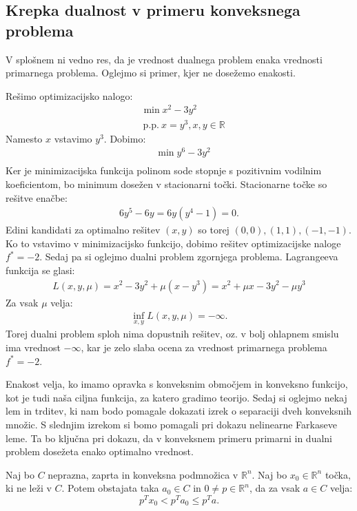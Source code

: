 \documentclass[mat1]{fmfdelo}
\newcommand{\R}{\mathbb R}
\begin{document}
\subsection{Krepka dualnost v primeru konveksnega problema}
V splošnem ni vedno res, da je vrednost dualnega problem enaka vrednosti primarnega problema. Oglejmo si primer, kjer ne dosežemo enakosti.
\begin{primer}
	Rešimo optimizacijsko nalogo: 
	\begin{align*}
	& \min x^2 - 3y^2 \\
	& ~\text{p.p.} ~ x=y^3, x, y\in \R 
	\end{align*}
	Namesto $x$ vstavimo $y^3$. Dobimo:
	\begin{align*}
	& \min y^6 - 3y^2 \\
	\end{align*}
	Ker je minimizacijska funkcija polinom sode stopnje s pozitivnim vodilnim koeficientom, bo minimum dosežen v stacionarni točki.  Stacionarne točke so rešitve enačbe:
	\begin{align*}
	6y^5 -6y = 6y(y^4 -1) = 0.
	\end{align*}
	Edini kandidati za optimalno rešitev $(x, y) $ so torej $(0,0), (1,1), (-1,-1)$. Ko to vstavimo v minimizacijsko funkcijo, dobimo rešitev optimizacijske naloge $f^*=-2.$ Sedaj pa si oglejmo dualni problem zgornjega problema. Lagrangeeva funkcija se glasi:
	\begin{align*}
	L(x, y, \mu) = x^2 -3 y^2 + \mu(x-y^3) = x^2 + \mu x -3y^2 - \mu y^3
	\end{align*}
	Za vsak $\mu$ velja:
	\begin{align*}
	\inf_{x, y}L(x,y,\mu) = -\infty.
	\end{align*}
	Torej dualni problem sploh nima dopustnih rešitev, oz. v bolj ohlapnem smislu ima vrednost $-\infty$, kar je zelo slaba ocena za vrednost primarnega problema $f^* = -2.$
\end{primer}

Enakost velja, ko imamo opravka s konveksnim območjem in konveksno funkcijo, kot je tudi naša ciljna funkcija, za katero gradimo teorijo. 
Sedaj si oglejmo nekaj lem in trditev, ki nam bodo pomagale dokazati izrek o separaciji dveh konveksnih množic. S slednjim izrekom si bomo pomagali pri dokazu nelinearne Farkaseve leme. Ta bo ključna pri dokazu, da v konveksnem primeru primarni in dualni problem dosežeta enako optimalno vrednost. 


\begin{trditev}\label{podpornik}
	Naj bo $C$ neprazna, zaprta in konveksna podmnožica v $\R^n$. Naj bo $x_0 \in \R^n$ točka, ki ne leži v $C$. Potem obstajata taka $a_0 \in C$ in $0\ne p \in \R^n$, da za vsak $a \in C$ velja:
	$$p^T x_0 < p^Ta_0 \le p^Ta.  $$
\end{trditev}
\end{document}
